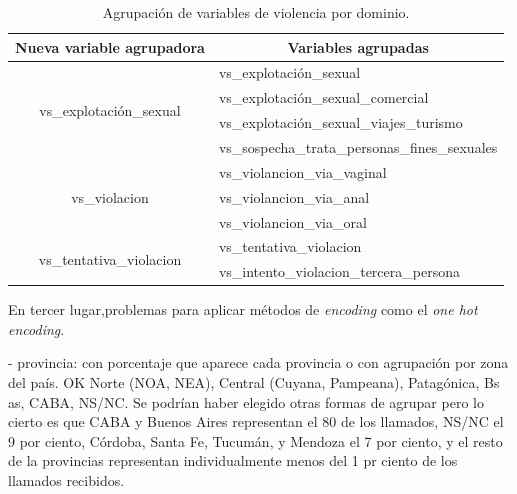 \documentclass[10 pt]{article}
\begin{document}
\begin{table}[H]
    \centering
    \caption{Agrupación de variables de violencia por dominio.}
    \label{tablaagrup}
    \begin{tabular}{|c|l|}
    \hline
    \multicolumn{1}{|l|}{\textbf{Nueva variable agrupadora}} & \multicolumn{1}{c|}{\textbf{Variables agrupadas}} \\ \hline
    \multirow{4}{*}{vs\_explotación\_sexual}                 & vs\_explotación\_sexual                           \\ \cline{2-2} 
                                                             & vs\_explotación\_sexual\_comercial                \\ \cline{2-2} 
                                                             & vs\_explotación\_sexual\_viajes\_turismo          \\ \cline{2-2} 
                                                             & vs\_sospecha\_trata\_personas\_fines\_sexuales    \\ \hline
    \multirow{3}{*}{vs\_violacion}                          & vs\_violancion\_via\_vaginal                      \\ \cline{2-2} 
                                                             & vs\_violancion\_via\_anal                         \\ \cline{2-2} 
                                                             & vs\_violancion\_via\_oral                         \\ \hline
    \multirow{2}{*}{vs\_tentativa\_violacion}                & vs\_tentativa\_violacion                     \\ \cline{2-2} 
                                                             & vs\_intento\_violacion\_tercera\_persona           \\ \hline
    \end{tabular}
    \end{table}


En tercer lugar,problemas para aplicar métodos de \textit{encoding} como el \textit{one hot encoding}. \citetext{\citealp[p.~3]{udilua2023encoding}} 


- provincia: con porcentaje que aparece cada provincia o con agrupación por zona del país. OK
Norte (NOA, NEA), Central (Cuyana, Pampeana), Patagónica, Bs as, CABA, NS/NC. Se podrían haber elegido otras formas de agrupar pero lo cierto es que CABA y Buenos Aires representan el 80 de los llamados, NS/NC el 9 por ciento, Córdoba, Santa Fe, Tucumán, y Mendoza el 7 por ciento, y el resto de la provincias representan individualmente menos del 1 pr ciento de los llamados recibidos.
\end{document}
